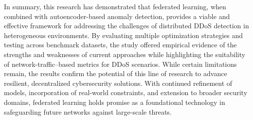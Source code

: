In summary, this research has demonstrated that federated learning, when combined with autoencoder-based anomaly detection, provides a viable and effective framework for addressing the challenges of distributed DDoS detection in heterogeneous environments. By evaluating multiple optimization strategies and testing across benchmark datasets, the study offered empirical evidence of the strengths and weaknesses of current approaches while highlighting the suitability of network-traffic–based metrics for DDoS scenarios. While certain limitations remain, the results confirm the potential of this line of research to advance resilient, decentralized cybersecurity solutions. With continued refinement of models, incorporation of real-world constraints, and extension to broader security domains, federated learning holds promise as a foundational technology in safeguarding future networks against large-scale threats.
